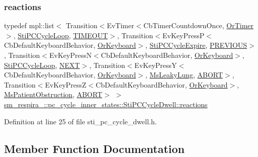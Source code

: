 \subsubsection{\texorpdfstring{reactions}{reactions}}
{\footnotesize\ttfamily typedef mpl\+::list$<$ Transition$<$Ev\+Timer$<$Cb\+Timer\+Countdown\+Once, \hyperlink{classsm__respira__1_1_1OrTimer}{Or\+Timer}$>$, \hyperlink{structsm__respira__1_1_1pc__cycle__inner__states_1_1StiPCCycleLoop}{Sti\+P\+C\+Cycle\+Loop}, \hyperlink{structsm__respira__1_1_1pc__cycle__inner__states_1_1StiPCCycleDwell_1_1TIMEOUT}{T\+I\+M\+E\+O\+UT}$>$, Transition$<$Ev\+Key\+PressP$<$Cb\+Default\+Keyboard\+Behavior, \hyperlink{classsm__respira__1_1_1OrKeyboard}{Or\+Keyboard}$>$, \hyperlink{structsm__respira__1_1_1pc__cycle__inner__states_1_1StiPCCycleExpire}{Sti\+P\+C\+Cycle\+Expire}, \hyperlink{structsm__respira__1_1_1pc__cycle__inner__states_1_1StiPCCycleDwell_1_1PREVIOUS}{P\+R\+E\+V\+I\+O\+US}$>$, Transition$<$Ev\+Key\+PressN$<$Cb\+Default\+Keyboard\+Behavior, \hyperlink{classsm__respira__1_1_1OrKeyboard}{Or\+Keyboard}$>$, \hyperlink{structsm__respira__1_1_1pc__cycle__inner__states_1_1StiPCCycleLoop}{Sti\+P\+C\+Cycle\+Loop}, \hyperlink{structsm__respira__1_1_1pc__cycle__inner__states_1_1StiPCCycleDwell_1_1NEXT}{N\+E\+XT}$>$, Transition$<$Ev\+Key\+PressY$<$Cb\+Default\+Keyboard\+Behavior, \hyperlink{classsm__respira__1_1_1OrKeyboard}{Or\+Keyboard}$>$, \hyperlink{classsm__respira__1_1_1MsLeakyLung}{Ms\+Leaky\+Lung}, \hyperlink{classABORT}{A\+B\+O\+RT}$>$, Transition$<$Ev\+Key\+PressZ$<$Cb\+Default\+Keyboard\+Behavior, \hyperlink{classsm__respira__1_1_1OrKeyboard}{Or\+Keyboard}$>$, \hyperlink{classsm__respira__1_1_1MsPatientObstruction}{Ms\+Patient\+Obstruction}, \hyperlink{classABORT}{A\+B\+O\+RT}$>$ $>$ \hyperlink{structsm__respira__1_1_1pc__cycle__inner__states_1_1StiPCCycleDwell_a70560279c411fb3963a3320257f938b5}{sm\+\_\+respira\+\_\+::pc\+\_\+cycle\+\_\+inner\+\_\+states\+::\+Sti\+P\+C\+Cycle\+Dwell\+::reactions}}



Definition at line 25 of file sti\+\_\+pc\+\_\+cycle\+\_\+dwell.\+h.



\subsection{Member Function Documentation}
\mbox{\label{structsm__respira__1_1_1pc__cycle__inner__states_1_1StiPCCycleDwell_ab1dc1de7d115a5d9989f7d18bc85662e}} 
